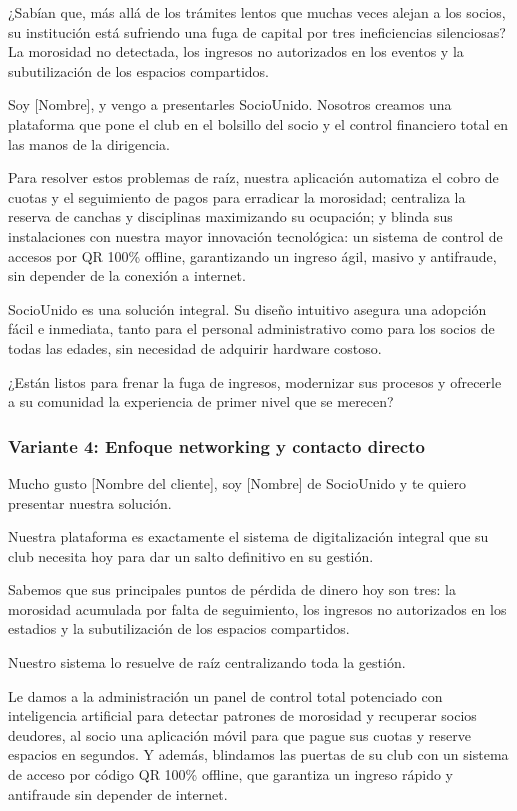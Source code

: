 ¿Sabían que, más allá de los trámites lentos que muchas veces alejan a los socios, su institución está sufriendo una fuga de capital por tres ineficiencias silenciosas? La morosidad no detectada, los ingresos no autorizados en los eventos y la subutilización de los espacios compartidos.

Soy [Nombre], y vengo a presentarles SocioUnido. Nosotros creamos una plataforma que pone el club en el bolsillo del socio y el control financiero total en las manos de la dirigencia. 

Para resolver estos problemas de raíz, nuestra aplicación automatiza el cobro de cuotas y el seguimiento de pagos para erradicar la morosidad; centraliza la reserva de canchas y disciplinas maximizando su ocupación; y blinda sus instalaciones con nuestra mayor innovación tecnológica: un sistema de control de accesos por QR 100\% offline, garantizando un ingreso ágil, masivo y antifraude, sin depender de la conexión a internet.

SocioUnido es una solución integral. Su diseño intuitivo asegura una adopción fácil e inmediata, tanto para el personal administrativo como para los socios de todas las edades, sin necesidad de adquirir hardware costoso.

¿Están listos para frenar la fuga de ingresos, modernizar sus procesos y ofrecerle a su comunidad la experiencia de primer nivel que se merecen?

\newpage

\subsubsection{Variante 4: Enfoque networking y contacto directo}

Mucho gusto [Nombre del cliente], soy [Nombre] de SocioUnido y te quiero presentar nuestra solución.

Nuestra plataforma es exactamente el sistema de digitalización integral que su club necesita hoy para dar un salto definitivo en su gestión.

Sabemos que sus principales puntos de pérdida de dinero hoy son tres: la morosidad acumulada por falta de seguimiento, los ingresos no autorizados en los estadios y la subutilización de los espacios compartidos.

Nuestro sistema lo resuelve de raíz centralizando toda la gestión.

Le damos a la administración un panel de control total potenciado con inteligencia artificial para detectar patrones de morosidad y recuperar socios deudores, al socio una aplicación móvil para que pague sus cuotas y reserve espacios en segundos. Y además, blindamos las puertas de su club con un sistema de acceso por código QR 100\% offline, que garantiza un ingreso rápido y antifraude sin depender de internet.

